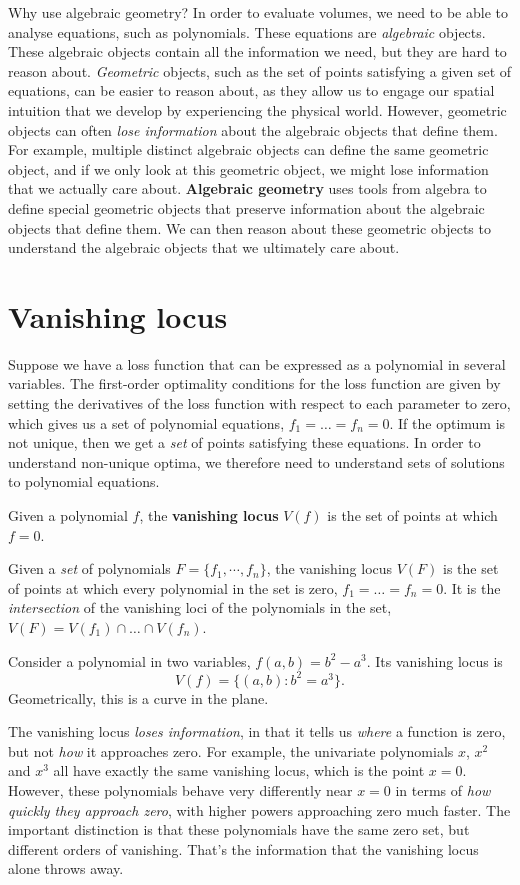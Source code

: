 \documentclass[12pt]{article}
\begin{document}
Why use algebraic geometry? In order to evaluate volumes, we need to be able to analyse equations, such as polynomials. These equations are \emph{algebraic} objects. These algebraic objects contain all the information we need, but they are hard to reason about. \emph{Geometric} objects, such as the set of points satisfying a given set of equations, can be easier to reason about, as they allow us to engage our spatial intuition that we develop by experiencing the physical world. However, geometric objects can often \emph{lose information} about the algebraic objects that define them. For example, multiple distinct algebraic objects can define the same geometric object, and if we only look at this geometric object, we might lose information that we actually care about. \textbf{Algebraic geometry} uses tools from algebra to define special geometric objects that preserve information about the algebraic objects that define them. We can then reason about these geometric objects to understand the algebraic objects that we ultimately care about.

\newpage
\section{Vanishing locus}\label{vanishing-locus-zero-set}

Suppose we have a loss function that can be expressed as a polynomial in several variables. The first-order optimality conditions for the loss function are given by setting the derivatives of the loss function with respect to each parameter to zero, which gives us a set of polynomial equations, $f_1=\dots=f_n=0$. If the optimum is not unique, then we get a \emph{set} of points satisfying these equations. In order to understand non-unique optima, we therefore need to understand sets of solutions to polynomial equations.

Given a polynomial $f$, the \textbf{vanishing locus} $V(f)$ is the set of points
at which $f=0$.

Given a \emph{set} of polynomials $F=\{f_1, \cdots, f_n\}$, the vanishing locus $V(F)$ is the set of points at which every polynomial in the set is zero, $f_1=\dots=f_n=0$. It is the \emph{intersection} of the vanishing loci of the polynomials in the set, $V(F)=V(f_1)\cap \dots\cap V(f_n)$.

Consider a polynomial in two variables, \(f(a,b)=b^2-a^3\).
Its vanishing locus is
\[
V(f)=\{(a,b):b^2=a^3\}.
\]
Geometrically, this is a curve in the plane.

The vanishing locus \emph{loses information}, in that it tells us \emph{where} a function is zero, but not \emph{how} it approaches zero. For example, the univariate polynomials \(x\), \(x^2\) and \(x^3\) all have exactly the same vanishing locus, which is the point \(x=0\). However, these polynomials behave very differently near $x=0$ in terms of \emph{how quickly they approach zero}, with higher powers approaching zero much faster. The important distinction is that these polynomials have the same zero set, but different orders of vanishing. That's the information that the vanishing locus alone throws away.
\end{document}
